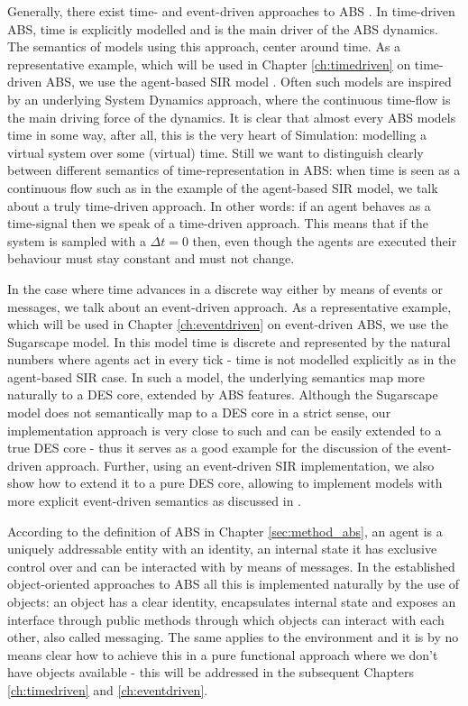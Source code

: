 Generally, there exist time- and event-driven approaches to ABS \cite{meyer_event-driven_2014}. In time-driven ABS, time is explicitly modelled and is the main driver of the ABS dynamics. The semantics of models using this approach, center around time. As a representative example, which will be used in Chapter \ref{ch:timedriven} on time-driven ABS, we use the agent-based SIR model \cite{macal_agent-based_2010, thaler_pure_2018}. Often such models are inspired by an underlying System Dynamics approach, where the continuous time-flow is the main driving force of the dynamics. It is clear that almost every ABS models time in some way, after all, this is the very heart of Simulation: modelling a virtual system over some (virtual) time. Still we want to distinguish clearly between different semantics of time-representation in ABS: when time is seen as a continuous flow such as in the example of the agent-based SIR model, we talk about a truly time-driven approach. In other words: if an agent behaves as a time-signal then we speak of a time-driven approach. This means that if the system is sampled with a $\Delta t = 0$ then, even though the agents are executed their behaviour must stay constant and must not change.

In the case where time advances in a discrete way either by means of events or messages, we talk about an event-driven approach. As a representative example, which will be used in Chapter \ref{ch:eventdriven} on event-driven ABS, we use the Sugarscape model. In this model time is discrete and represented by the natural numbers where agents act in every tick - time is not modelled explicitly as in the agent-based SIR case. In such a model, the underlying semantics map more naturally to a DES core, extended by ABS features. Although the Sugarscape model does not semantically map to a DES core in a strict sense, our implementation approach is very close to such and can be easily extended to a true DES core - thus it serves as a good example for the discussion of the event-driven approach. Further, using an event-driven SIR implementation, we also show how to extend it to a pure DES core, allowing to implement models with more explicit event-driven semantics as discussed in \cite{meyer_event-driven_2014}.

According to the definition of ABS in  Chapter \ref{sec:method_abs}, an agent is a uniquely addressable entity with an identity, an internal state it has exclusive control over and can be interacted with by means of messages. In the established object-oriented approaches to ABS all this is implemented naturally by the use of objects: an object has a clear identity, encapsulates internal state and exposes an interface through public methods through which objects can interact with each other, also called messaging. The same applies to the environment and it is by no means clear how to achieve this in a pure functional approach where we don't have objects available - this will be addressed in the subsequent Chapters \ref{ch:timedriven} and \ref{ch:eventdriven}.

